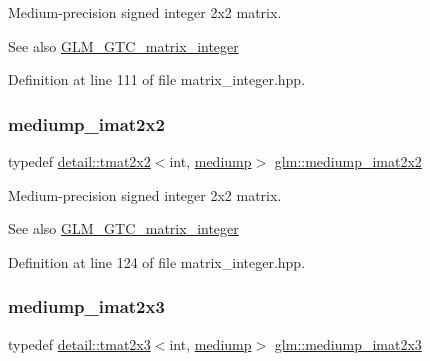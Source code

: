 Medium-\/precision signed integer 2x2 matrix. \begin{DoxySeeAlso}{See also}
\hyperlink{group__gtc__matrix__integer}{G\+L\+M\+\_\+\+G\+T\+C\+\_\+matrix\+\_\+integer} 
\end{DoxySeeAlso}


Definition at line 111 of file matrix\+\_\+integer.\+hpp.

\mbox{\label{group__gtc__matrix__integer_ga472222f6e3754124ee9cb64acaaedac1}} 
\subsubsection{\texorpdfstring{mediump\+\_\+imat2x2}{mediump\_imat2x2}}
{\footnotesize\ttfamily typedef \hyperlink{structglm_1_1detail_1_1tmat2x2}{detail\+::tmat2x2}$<$int, \hyperlink{namespaceglm_a0f04f086094c747d227af4425893f545a6416f3ea0c9025fb21ed50c4d6620482}{mediump}$>$ \hyperlink{group__gtc__matrix__integer_ga472222f6e3754124ee9cb64acaaedac1}{glm\+::mediump\+\_\+imat2x2}}

Medium-\/precision signed integer 2x2 matrix. \begin{DoxySeeAlso}{See also}
\hyperlink{group__gtc__matrix__integer}{G\+L\+M\+\_\+\+G\+T\+C\+\_\+matrix\+\_\+integer} 
\end{DoxySeeAlso}


Definition at line 124 of file matrix\+\_\+integer.\+hpp.

\mbox{\label{group__gtc__matrix__integer_gabc92c714c2d257213c5b0771669df177}} 
\subsubsection{\texorpdfstring{mediump\+\_\+imat2x3}{mediump\_imat2x3}}
{\footnotesize\ttfamily typedef \hyperlink{structglm_1_1detail_1_1tmat2x3}{detail\+::tmat2x3}$<$int, \hyperlink{namespaceglm_a0f04f086094c747d227af4425893f545a6416f3ea0c9025fb21ed50c4d6620482}{mediump}$>$ \hyperlink{group__gtc__matrix__integer_gabc92c714c2d257213c5b0771669df177}{glm\+::mediump\+\_\+imat2x3}}


